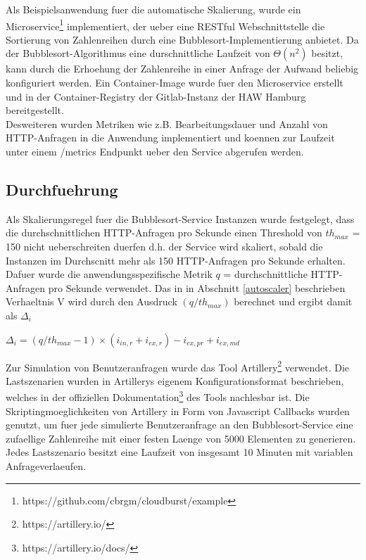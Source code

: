 \documentclass[runningheads]{llncs}
\begin{document}
Als Beispielsanwendung fuer die automatische Skalierung, wurde ein Microservice\footnote{https://github.com/cbrgm/cloudburst/example} implementiert, der ueber eine RESTful Webschnittstelle die Sortierung von Zahlenreihen durch eine Bubblesort-Implementierung anbietet. Da der Bubblesort-Algorithmus eine durschnittliche Laufzeit von $\Theta \left( n^{2}\right)$ besitzt, kann durch die Erhoehung der Zahlenreihe in einer Anfrage der Aufwand beliebig konfiguriert werden. Ein Container-Image wurde fuer den Microservice erstellt und in der Container-Registry der Gitlab-Instanz der HAW Hamburg bereitgestellt. \\

Desweiteren wurden Metriken wie z.B. Bearbeitungsdauer und Anzahl von HTTP-Anfragen in die Anwendung implementiert und koennen zur Laufzeit unter einem /metrics Endpunkt ueber den Service abgerufen werden.

\subsection{Durchfuehrung}

Als Skalierungsregel fuer die Bubblesort-Service Instanzen wurde festgelegt, dass die durchschnittlichen HTTP-Anfragen pro Sekunde einen Threshold von $th_{max}$ = 150 nicht ueberschreiten duerfen d.h. der Service  wird skaliert, sobald die Instanzen im Durchscnitt mehr als 150 HTTP-Anfragen pro Sekunde erhalten. \\

Dafuer wurde die anwendungsspezifische Metrik $q$ = durchschnittliche HTTP-Anfragen pro Sekunde verwendet.
Das in in Abschnitt \ref{autoscaler} beschrieben Verhaeltnis V wird durch den Ausdruck $(q/th_{max})$ berechnet und ergibt damit als $\Delta_{i}$

\begin{center}
	$\Delta_{i} = (q/th_{max}-1) \times (i_{in,r} + i_{ex,r}) - i_{ex,pr} + i_{ex,md}$
\end{center}

Zur Simulation von Benutzeranfragen wurde das Tool Artillery\footnote{https://artillery.io/} verwendet. Die Lastszenarien wurden in Artillerys eigenem Konfigurationsformat beschrieben, welches  in der offiziellen Dokumentation\footnote{https://artillery.io/docs/} des Tools nachlesbar ist. Die Skriptingmoeglichkeiten von Artillery in Form von Javascript Callbacks  wurden genutzt, um fuer jede simulierte Benutzeranfrage an den Bubblesort-Service eine zufaellige Zahlenreihe mit einer festen Laenge von 5000 Elementen zu generieren. Jedes Lastszenario besitzt eine Laufzeit von insgesamt 10 Minuten mit variablen Anfrageverlaeufen.\\
\end{document}
